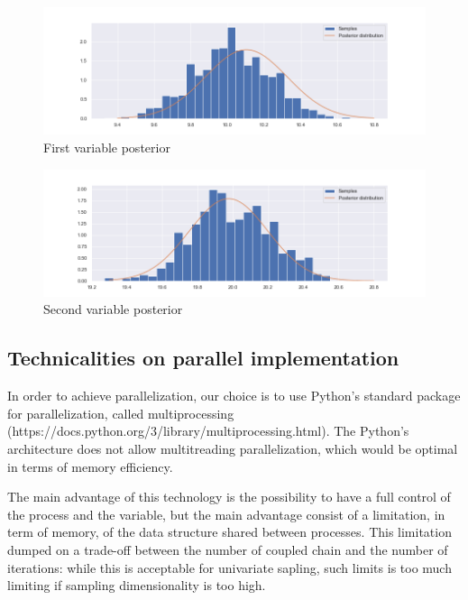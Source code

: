 \documentclass[11pt,a4paper,oneside]{report}
\begin{document}
\begin{figure}[h!]
	\centering
	\includegraphics[width=\textwidth]{immagini_coupling_multivariate/coupling_mult_histogram_1}	
	\caption{First variable posterior}
\end{figure}
\begin{figure}[h!]
	\centering
	\includegraphics[width=\textwidth]{immagini_coupling_multivariate/coupling_mult_histogram_2}
	\caption{Second variable posterior}
\end{figure}

\clearpage

\subsection{Technicalities on parallel implementation}

In order to achieve parallelization, our choice is to use Python's standard package for parallelization, called multiprocessing (https://docs.python.org/3/library/multiprocessing.html). The Python's architecture does not allow multitreading parallelization, which would be optimal in terms of memory efficiency.

The main advantage of this technology is the possibility to have a full control of the process and the variable, but the main advantage consist of a limitation, in term of memory, of the data structure shared between processes. This limitation dumped on a trade-off between the number of coupled chain and the number of iterations: while this is acceptable for univariate sapling, such limits is too much limiting if sampling dimensionality is too high.
\end{document}
